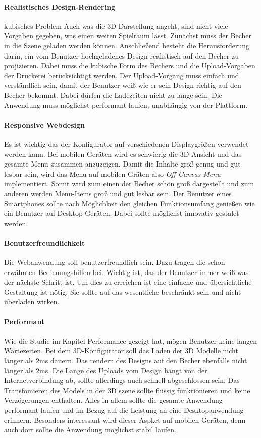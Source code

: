 \paragraph{Realistisches Design-Rendering}
kubisches Problem
Auch was die 3D-Darstellung angeht, sind nicht viele Vorgaben gegeben, was einen weiten Spielraum lässt. Zunächst muss der Becher in die Szene geladen werden können. Anschließend besteht die Herausforderung darin, ein vom Benutzer hochgeladenes Design realistisch auf den Becher zu projizieren. Dabei muss die kubische Form des Bechers und die Upload-Vorgaben der Druckerei berücksichtigt werden. Der Upload-Vorgang muss einfach und verständlich sein, damit der Benutzer weiß wie er sein Design richtig auf den Becher bekommt. Dabei dürfen die Ladezeiten nicht zu lange sein. Die Anwendung muss möglichst performant laufen, unabhängig von der Plattform.
%
\paragraph{Responsive Webdesign}
Es ist wichtig das der Konfigurator auf verschiedenen Displaygrößen verwendet werden kann. Bei mobilen Geräten wird es schwierig die 3D Ansicht und das gesamte Menu zusammen anzuzeigen. Damit die Inhalte groß genug und gut lesbar sein, wird das Menu auf mobilen Gräten also \textit{Off-Canvas-Menu} implementiert. Somit wird zum einen der Becher schön groß dargestellt und zum anderen werden Menu-Items groß und gut lesbar sein. Der Benutzer eines Smartphones sollte nach Möglichkeit den gleichen Funktionsumfang genießen wie ein Benutzer auf Desktop Geräten. Dabei sollte möglichst innovativ gestalet werden.
%
\paragraph{Benutzerfreundlichkeit}
Die Webanwendung soll benutzerfreundlich sein. Dazu tragen die schon erwähnten Bedienungshilfen bei. Wichtig ist, das der Benutzer immer weiß was der nächste Schritt ist. Um dies zu erreichen ist eine einfache und übersichtliche Gestaltung ist nötig. Sie sollte auf das wesentliche beschränkt sein und nicht überladen wirken.
%
\paragraph{Performant}
Wie die Studie im Kapitel Performance gezeigt hat, mögen Benutzer keine langen Wartezeiten. Bei dem 3D-Konfigurator soll das Laden der 3D Modelle nicht länger als 2ms dauern. Das rendern des Designs auf den Becher ebenfalls nicht länger als 2ms. Die Länge des Uploads vom Design hängt von der Internetverbindung ab, sollte allerdings auch schnell abgeschlossen sein. Das Transfomieren des Models in der 3D szene sollte flüssig funktionieren und keine Verzögerungen enthalten. Alles in allem sollte die gesamte Anwendung performant laufen und im Bezug auf die Leistung an eine Desktopanwendung erinnern. Besonders interessant wird dieser Aspket auf mobilen Geräten, denn auch dort sollte die Anwendung möglichst stabil laufen.
%
%
%
%
%
